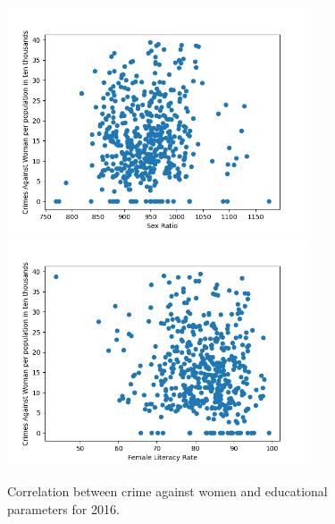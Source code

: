 \documentclass[twoside]{article}
\begin{document}
\begin{figure}[h]
    \centering
    \includegraphics[width=0.8\textwidth]{sex_ratio_crimes_against_women_2016.png}
     \includegraphics[width=0.8\textwidth]{female_literacy_rate_crimes_against_women_2016.png}
     \caption{Correlation between crime against women and educational parameters for 2016.}
    \label{fig:crime_scatter}
\end{figure}
\end{document}
